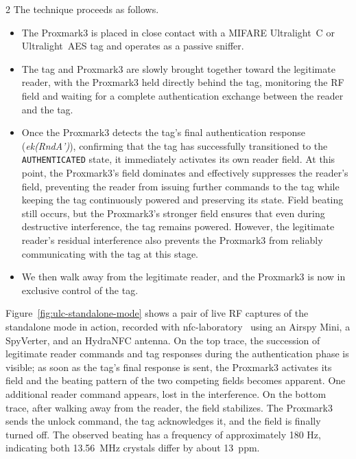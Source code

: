\documentclass[10pt,letterpaper]{article}
\begin{document}
\begin{multicols}{2}
The technique proceeds as follows.

\begin{itemize}
    \item The Proxmark3 is placed in close contact with a MIFARE Ultralight~C or Ultralight~AES tag and operates as a passive sniffer.
    \item The tag and Proxmark3 are slowly brought together toward the legitimate reader, with the Proxmark3 held directly behind the tag, monitoring the RF field and waiting for a complete authentication exchange between the reader and the tag.
    \item Once the Proxmark3 detects the tag's final authentication response (\textit{ek(RndA')}), confirming that the tag has successfully transitioned to the \texttt{AUTHENTICATED} state, it immediately activates its own reader field. At this point, the Proxmark3's field dominates and effectively suppresses the reader's field, preventing the reader from issuing further commands to the tag while keeping the tag continuously powered and preserving its state. Field beating still occurs, but the Proxmark3's stronger field ensures that even during destructive interference, the tag remains powered. However, the legitimate reader's residual interference also prevents the Proxmark3 from reliably communicating with the tag at this stage.
    \item We then walk away from the legitimate reader, and the Proxmark3 is now in exclusive control of the tag.
\end{itemize}

\vspace{0.5em}
\noindent
\begin{minipage}{\linewidth}
    \centering
    \resizebox{\columnwidth}{!}{}
    \captionsetup{hypcap=false}
    \label{fig:ulc-standalone-mode}
\end{minipage}
\vspace{0.5em}

Figure~\ref{fig:ulc-standalone-mode} shows a pair of live RF captures of the standalone mode in action, recorded with nfc-laboratory~\cite{nfclab} using an Airspy Mini, a SpyVerter, and an HydraNFC antenna.
On the top trace, the succession of legitimate reader commands and tag responses during the authentication phase is visible; as soon as the tag's final response is sent, the Proxmark3 activates its field and the beating pattern of the two competing fields becomes apparent. One additional reader command appears, lost in the interference.
On the bottom trace, after walking away from the reader, the field stabilizes. The Proxmark3 sends the unlock command, the tag acknowledges it, and the field is finally turned off.
The observed beating has a frequency of approximately 180 Hz, indicating both 13.56~MHz crystals differ by about 13~ppm.


\end{multicols}
\end{document}
